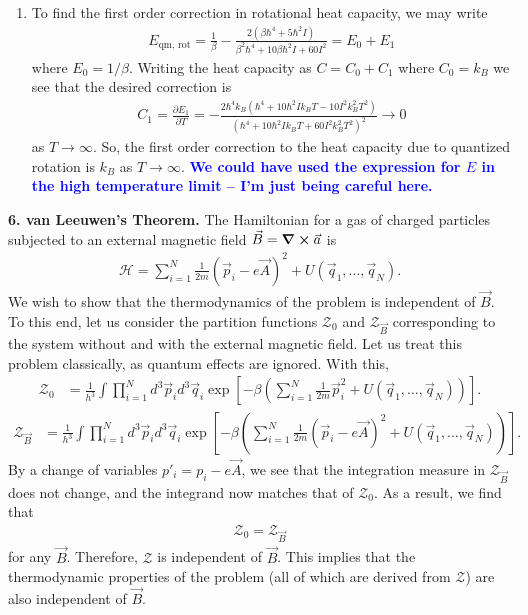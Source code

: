 \documentclass{article}
\theoremstyle{definition}
\newcommand{\p}{\partial}
\newcommand{\ham}{\mathcal{H}}
\newcommand{\be}{\beta}
\newcommand{\f}[2]{\frac{#1}{#2}}
\newcommand{\lp}{\left(}
\newcommand{\rp}{\right)}
\newcommand{\lb}{\left[}
\newcommand{\rb}{\right]}
\begin{document}
\begin{enumerate}[label=(\alph*)]
	
	\item To find the first order correction in rotational heat capacity, we may write
	\begin{align*}
	E_\text{qm, rot} = \f{1}{\be} - \f{2(\be \hbar^4 + 5 \hbar^2 I )}{\be^2 \hbar^4 + 10 \be \hbar^2 I + 60 I^2}  = E_0 + E_1
	\end{align*}
	where $E_0 = 1/\be$. Writing the heat capacity as $C = C_0 + C_1$ where $C_0 = k_B$ we see that the desired correction is 
	\begin{align*}
	C_1 = \f{\p E_1}{\p T} = -\frac{2 \hbar^4 k_B \left(\hbar^4+10 \hbar^2 I
		k_B T -10 I^2 k_B^2 T^2\right)}{\left(\hbar^4+10
		\hbar^2 I k_B T + 60 I^2 k_B^2 T^2\right)^2} \to 0 
	\end{align*}
	as $T\to \infty$. So, the first order correction to the heat capacity due to quantized rotation is $\boxed{k_B}$ as $T\to \infty$. \textbf{\textcolor{blue}{We could have used the expression for $E$ in the high temperature limit -- I'm just being careful here.}}
\end{enumerate}

\noindent \textbf{6. van Leeuwen's Theorem.} The Hamiltonian for a gas of charged particles subjected to an external magnetic field $\vec{B} = \curl \vec{a}$ is 
\begin{align*}
\ham = \sum^N_{i=1} \f{1}{2m}(\vec{p}_i - e\vec{A})^2 + U(\vec{q}_1, \dots, \vec{q}_N).
\end{align*}
We wish to show that the thermodynamics of the problem is independent of $\vec{B}$. To this end, let us consider the partition functions $\mathcal{Z}_0$ and $\mathcal{Z}_{\vec{B}}$ corresponding to the system without and with the external magnetic field. Let us treat this problem classically, as quantum effects are ignored. With this, 
\begin{align*}
\mathcal{Z}_0 
&= \f{1}{h^3} \int \prod^N_{i=1} d^3\vec{p}_i d^3 \vec{q}_i \exp\lb -\be \lp 
\sum^N_{i=1} \f{1}{2m}\vec{p}_i^2 + U(\vec{q}_1, \dots, \vec{q}_N) \rp \rb.
\end{align*}
\begin{align*}
\mathcal{Z}_{\vec{B}}
&= \f{1}{h^3} \int \prod^N_{i=1} d^3\vec{p}_i d^3 \vec{q}_i \exp\lb -\be \lp 
\sum^N_{i=1} \f{1}{2m}(\vec{p}_i - e\vec{A})^2 + U(\vec{q}_1, \dots, \vec{q}_N) \rp \rb.
\end{align*}
By a change of variables $p'_i = p_i - e\vec{A}$, we see that the integration measure in $\mathcal{Z}_{\vec{B}}$ does not change, and the integrand now matches that of $\mathcal{Z}_0$. As a result, we find that
\begin{align*}
\mathcal{Z}_0 = \mathcal{Z}_{\vec{B}}
\end{align*}
for any $\vec{B}$. Therefore, $\mathcal{Z}$ is independent of $\vec{B}$. This implies that the thermodynamic properties of the problem (all of which are derived from $\mathcal{Z}$) are also independent of $\vec{B}$. \\ 
\end{document}
